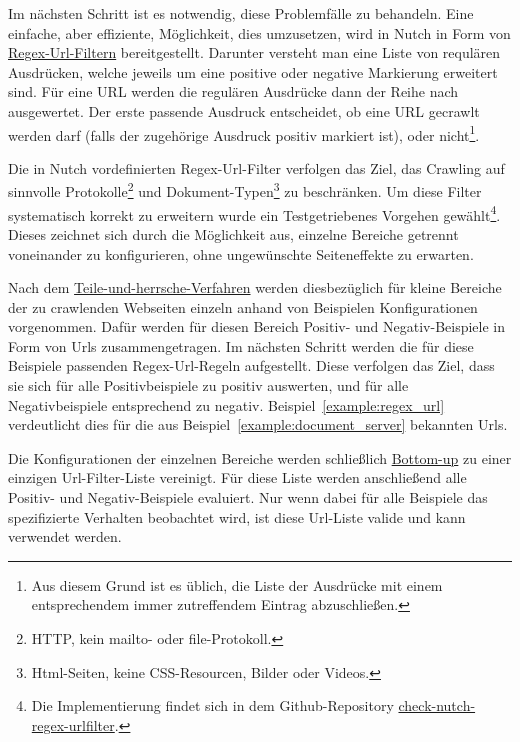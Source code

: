 Im nächsten Schritt ist es notwendig, diese Problemfälle zu behandeln.
Eine einfache, aber effiziente, Möglichkeit, dies umzusetzen, wird in Nutch in Form von \href{https://github.com/apache/nutch/blob/master/conf/regex-urlfilter.txt.template}{Regex-Url-Filtern} bereitgestellt.
Darunter versteht man eine Liste von requlären Ausdrücken, welche jeweils um eine positive oder negative Markierung erweitert sind.
Für eine URL werden die regulären Ausdrücke dann der Reihe nach ausgewertet.
Der erste passende Ausdruck entscheidet, ob eine URL gecrawlt werden darf (falls der zugehörige Ausdruck positiv markiert ist),
oder nicht\footnote{Aus diesem Grund ist es üblich, 
die Liste der Ausdrücke mit einem entsprechendem immer zutreffendem Eintrag abzuschließen.}.

Die in Nutch vordefinierten Regex-Url-Filter verfolgen das Ziel,
das Crawling auf sinnvolle Protokolle\footnote{HTTP, kein mailto- oder file-Protokoll.}
und Dokument-Typen\footnote{Html-Seiten, keine CSS-Resourcen, Bilder oder Videos.} zu beschränken.
Um diese Filter systematisch korrekt zu erweitern wurde ein
Testgetriebenes Vorgehen gewählt\footnote{Die Implementierung findet
sich in dem Github-Repository \href{https://github.com/mam10eks/check-nutch-regex-urlfilter}{check-nutch-regex-urlfilter}.}.
Dieses zeichnet sich durch die Möglichkeit aus, einzelne Bereiche getrennt voneinander zu konfigurieren, ohne ungewünschte Seiteneffekte zu erwarten.

Nach dem \href{https://de.wikipedia.org/wiki/Teile-und-herrsche-Verfahren}{Teile-und-herrsche-Verfahren} werden
diesbezüglich für kleine Bereiche der zu crawlenden Webseiten einzeln anhand von Beispielen Konfigurationen vorgenommen.
Dafür werden für diesen Bereich Positiv- und Negativ-Beispiele in Form von Urls zusammengetragen.
Im nächsten Schritt werden die für diese Beispiele passenden Regex-Url-Regeln aufgestellt.
Diese verfolgen das Ziel, dass sie sich für alle Positivbeispiele zu positiv auswerten, und für alle Negativbeispiele entsprechend zu negativ.
Beispiel~\ref{example:regex_url} verdeutlicht dies für die aus Beispiel~\ref{example:document_server} bekannten Urls.

Die Konfigurationen der einzelnen Bereiche werden schließlich \href{https://de.wikipedia.org/wiki/Top-down_und_Bottom-up}{Bottom-up} zu einer einzigen 
Url-Filter-Liste vereinigt.
Für diese Liste werden anschließend alle Positiv- und Negativ-Beispiele evaluiert.
Nur wenn dabei für alle Beispiele das spezifizierte Verhalten beobachtet wird, ist diese Url-Liste valide und kann verwendet werden.

